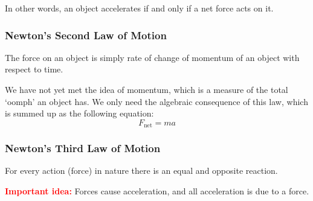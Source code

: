 \documentclass[a4paper]{amsbook}
\begin{document}
In other words, an object accelerates if and only if a net force acts on it.

\subsubsection{Newton's Second Law of Motion} The force on an object is simply rate of change of momentum of an object with respect
to time.

We have not yet met the idea of momentum, which is a measure of the total `oomph' an object has. We only need the algebraic consequence
of this law, which is summed up as the following equation:
\begin{equation}
  F_{\text{net}} = ma
\end{equation}

\subsubsection{Newton's Third Law of Motion} For every action (force) in nature there is an equal and opposite reaction.

\textbf{\textcolor{red}{Important idea:}} Forces cause acceleration, and all acceleration is due to a force.
\end{document}
